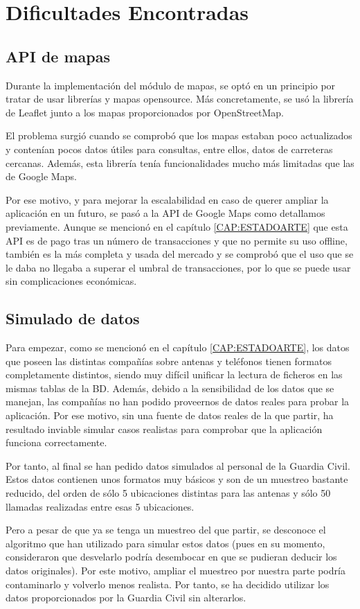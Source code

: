 \section{Dificultades Encontradas\label{SEC:DIFICULTAD}}
  \subsection{API de mapas}
    Durante la implementación del módulo de mapas, se optó en un principio por tratar de usar librerías y mapas opensource. Más concretamente, se usó la librería de Leaflet junto a los mapas proporcionados por OpenStreetMap.
    
    El problema surgió cuando se comprobó que los mapas estaban poco actualizados y contenían pocos datos útiles para consultas, entre ellos, datos de carreteras cercanas. Además, esta librería tenía funcionalidades mucho más limitadas que las de Google Maps.
    
    Por ese motivo, y para mejorar la escalabilidad en caso de querer ampliar la aplicación en un futuro, se pasó a la API de Google Maps como detallamos previamente. 
    Aunque se mencionó en el capítulo \ref{CAP:ESTADOARTE} que esta API es de pago tras un número de transacciones y que no permite su uso offline, también es la más completa y usada del mercado y se comprobó que el uso que se le daba no llegaba a superar el umbral de transacciones, por lo que se puede usar sin complicaciones económicas.
    
    
   \subsection{Simulado de datos}
    Para empezar, como se mencionó en el capítulo \ref{CAP:ESTADOARTE}, los datos que poseen las distintas compañías sobre antenas y teléfonos tienen formatos completamente distintos, siendo muy difícil unificar la lectura de ficheros en las mismas tablas de la BD.
    Además, debido a la sensibilidad de los datos que se manejan, las compañías no han podido proveernos de datos reales para probar la aplicación. 
    Por ese motivo, sin una fuente de datos reales de la que partir, ha resultado inviable simular casos realistas para comprobar que la aplicación funciona correctamente. 
    
    Por tanto, al final se han pedido datos simulados al personal de la Guardia Civil. Estos datos contienen unos formatos muy básicos y son de un muestreo bastante reducido, del orden de sólo 5 ubicaciones distintas para las antenas y sólo 50 llamadas realizadas entre esas 5 ubicaciones.
    
    Pero a pesar de que ya se tenga un muestreo del que partir, se desconoce el algoritmo que han utilizado para simular estos datos (pues en su momento, consideraron que desvelarlo podría desembocar en que se pudieran deducir los datos originales). Por este motivo, ampliar el muestreo por nuestra parte podría contaminarlo y volverlo menos realista.
    Por tanto, se ha decidido utilizar los datos proporcionados por la Guardia Civil sin alterarlos.
    
    